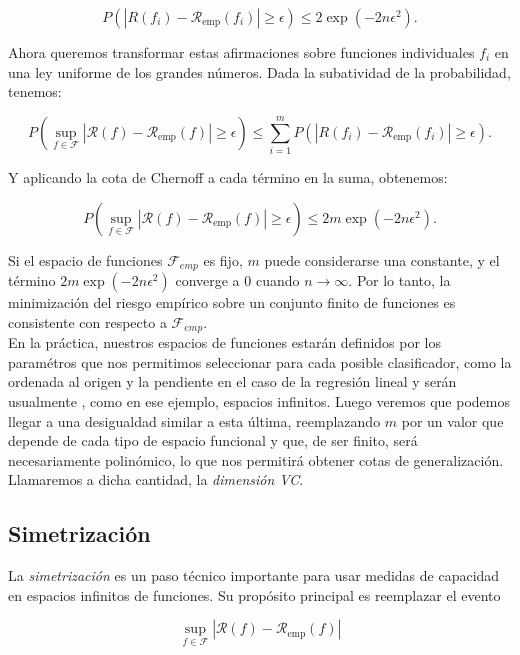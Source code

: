 \documentclass{report}
\begin{document}
\[
P\left(|R(f_i) - \mathcal{R}_{\text{emp}}(f_i)| \geq \epsilon \right) \leq 2 \exp(-2n\epsilon^2).
\]

Ahora queremos transformar estas afirmaciones sobre funciones individuales \(f_i\) en una ley uniforme de los 
grandes números. Dada la subatividad de la probabilidad, tenemos:

\[
P\left(\sup_{f \in \mathcal{F}} |\mathcal{R}(f) - \mathcal{R}_{\text{emp}}(f)| \geq \epsilon \right) \leq \sum_{i=1}^m P\left(|R(f_i) - \mathcal{R}_{\text{emp}}(f_i)| \geq \epsilon \right).
\]

Y aplicando la cota de Chernoff a cada término en la suma, obtenemos:

\begin{equation}
P\left(\sup_{f \in \mathcal{F}} |\mathcal{R}(f) - \mathcal{R}_{\text{emp}}(f)| \geq \epsilon \right) \leq 2m \exp(-2n\epsilon^2). \label{eq: chernoff acotada por m}
\end{equation}

Si el espacio de funciones \(\mathcal{F}_{emp}\) es fijo, \(m\) puede considerarse una 
constante, y el término \(2m \exp(-2n\epsilon^2)\) converge a \(0\) cuando \(n \to \infty\). Por lo tanto,
la minimización del riesgo empírico sobre un conjunto finito de funciones es consistente con respecto 
a \(\mathcal{F}_{emp}\). \\

En la práctica, nuestros espacios de funciones estarán definidos por los paramétros que nos permitimos 
seleccionar para cada posible clasificador, como la ordenada al origen y la pendiente en el caso de la regresión lineal y serán usualmente
, como en ese ejemplo,
espacios infinitos. Luego veremos que podemos llegar a una desigualdad similar a esta última, reemplazando $m$ por un valor que depende
de cada tipo de espacio funcional y que, de ser finito, será necesariamente polinómico, lo que nos permitirá obtener cotas de generalización.
Llamaremos a dicha cantidad, la \textit{dimensión VC}.\newline

\subsection{Simetrización}

La \textit{simetrización} es un paso técnico importante para usar medidas de capacidad en espacios infinitos de 
funciones. Su propósito principal es reemplazar el evento 

\[
\sup_{f \in \mathcal{F}} |\mathcal{R}(f) - \mathcal{R}_{\text{emp}}(f)|
\]
\end{document}

